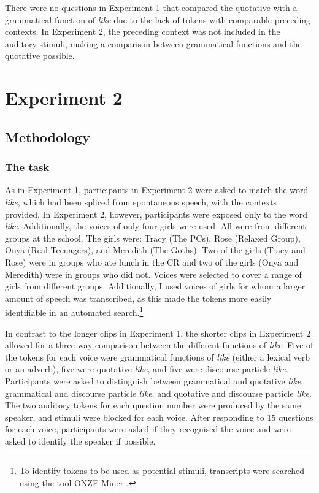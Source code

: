 There were no questions in Experiment 1 that compared the quotative with a grammatical function of \textit{like} due to the lack of tokens with comparable preceding contexts.  In Experiment 2, the preceding context was not included in the auditory stimuli, making a comparison between grammatical functions and the quotative possible.




\section{Experiment 2} 

\subsection{Methodology}

\subsubsection{The task} 

As in Experiment 1, participants in Experiment 2 were asked to match the word \textit{like}, which had been spliced from spontaneous speech, with the contexts provided.  In Experiment 2, however, participants were exposed only to the word \textit{like}.  Additionally, the voices of only four girls were used.  All were from different groups at the school.  The girls were: Tracy (The PCs), Rose (Relaxed Group), Onya (Real Teenagers), and Meredith (The Goths).  Two of the girls (Tracy and Rose) were in groups who ate lunch in the CR and two of the girls (Onya and Meredith) were in groups who did not.  Voices were selected to cover a range of girls from different groups.  Additionally, I used voices of girls for whom a larger amount of speech was transcribed, as this made the tokens more easily identifiable in an automated search.\footnote{To identify tokens to be used as potential stimuli, transcripts were searched using the tool ONZE Miner \cite{onzeminer}.}  

In contrast to the longer clips in Experiment 1, the shorter clips in Experiment 2 allowed for a three-way comparison between the different functions of \textit{like}.  Five of the tokens for each voice were grammatical functions of \textit{like} (either a lexical verb or an adverb), five were quotative \textit{like}, and five were discourse particle \textit{like}.  Participants were asked to distinguish between grammatical and quotative \textit{like}, grammatical and discourse particle \textit{like}, and quotative and discourse particle \textit{like}.  The two auditory tokens for each question number were produced by the same speaker, and stimuli were blocked for each voice.  After responding to 15 questions for each voice, participants were asked if they recognised the voice and were asked to identify the speaker if possible.  


